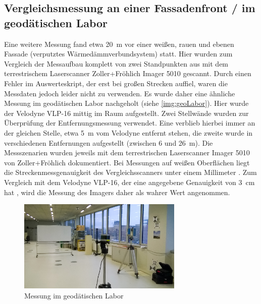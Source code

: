 \documentclass[a4paper,12pt,bibliography=totoc, listof=totoc,titlepage,pointlessnumbers]{scrreprt}
\begin{document}
\subsection{Vergleichsmessung an einer Fassadenfront / im geodätischen Labor}
Eine weitere Messung fand etwa 20~m vor einer weißen, rauen und ebenen Fassade (verputztes Wärmedämmverbundsystem) statt. Hier wurden zum Vergleich der Messaufbau komplett von zwei Standpunkten aus mit dem terrestrischem Laser\-scan\-ner Zoller+Fröhlich Imager 5010 gescannt. Durch einen Fehler im Auswerteskript, der erst bei großen Strecken auffiel, waren die Messdaten jedoch leider nicht zu verwenden. Es wurde daher eine ähnliche Messung im geodätischen Labor nachgeholt (siehe \autoref{img:geoLabor}).
Hier wurde der Velodyne VLP-16 mittig im Raum aufgestellt. Zwei Stellwände wurden zur Überprüfung der Entfernungsmessung verwendet. Eine verblieb hierbei immer an der gleichen Stelle, etwa 5~m vom Velodyne entfernt stehen, die zweite wurde in verschiedenen Entfernungen aufgestellt (zwischen 6 und 26~m). Die Messszenarien wurden jeweils mit dem terrestrischen Laser\-scan\-ner Imager 5010 von Zoller+Fröhlich dokumentiert. Bei Messungen auf weißen Oberflächen liegt die Streckenmessgenauigkeit des Vergleichsscanners unter einem Millimeter \citep{imager5010}. Zum Vergleich mit dem Velodyne VLP-16, der eine angegebene Genauigkeit von 3~cm hat \citep{vlpSheet}, wird die Messung des Imagers daher als wahrer Wert angenommen.

\begin{figure}[!ht]
 \centering
 \includegraphics[width=0.7\textwidth]{./img/geoLabor.jpg}
 \caption{Messung im geodätischen Labor}
 \label{img:geoLabor}
\end{figure}
\end{document}
